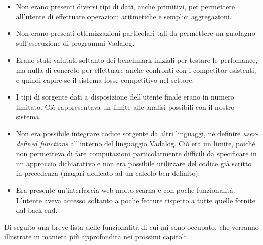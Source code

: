 \begin{itemize}
	\item Non erano presenti diversi tipi di dati, anche primitivi, per permettere all'utente di effettuare operazioni aritmetiche e semplici aggregazioni. 
	\item Non erano presenti ottimizzazioni particolari tali da permettere un guadagno sull'esecuzione di programmi Vadalog. 
	\item Erano stati valutati soltanto dei benchmark iniziali per testare le perfomance, ma nulla di concreto per effettuare anche confronti con i competitor esistenti, e quindi capire se il sistema fosse competitivo nel settore.
	\item I tipi di sorgente dati a disposizione dell'utente finale erano in numero limitato. Ciò rappresentava un limite alle analisi possibili con il nostro sistema. 
	\item Non era possibile integrare codice sorgente da altri linguaggi, né definire \emph{user-defined functions} all'interno del linguaggio Vadalog. Ciò era un limite, poiché non permetteva di fare computazioni particolarmente difficili da specificare in un approccio dichiarativo e non era possibile utilizzare del codice già scritto in precedenza (magari dedicato ad un calcolo ben definito).
	\item Era presente un'interfaccia web molto scarna e con poche funzionalità. L'utente aveva accesso soltanto a poche feature rispetto a tutte quelle fornite dal back-end.
\end{itemize}
Di seguito una breve lista delle funzionalità di cui mi sono occupato, che verranno illustrate in maniera più approfondita nei prossimi capitoli:
